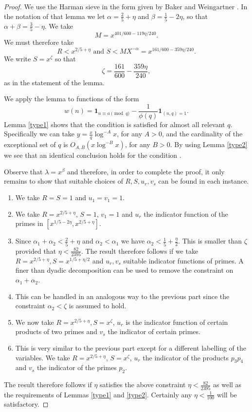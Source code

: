 \documentclass[12pt]{amsart}
\theoremstyle{plain}
\theoremstyle{definition}
\numberwithin{equation}{section}
\def \a{\alpha} \def \b{\beta} \def \d{\delta} \def \e{\varepsilon} \def \g{\gamma} \def \k{\kappa} \def \l{\lambda} \def \s{\sigma} \def \t{\theta} \def \z{\zeta}
\begin{document}
\begin{proof}
We use the Harman sieve in the form given by Baker and Weingartner \cite[Lemma 14]{bakerw}.  In the notation of that lemma we let 
$\a=\frac25+\eta$
and $\b=\frac15-2\eta$, so that $\a+\b=\frac35-\eta$. We take 
$$M=x^{401/600-119\eta/240}.$$ 
We must therefore take 
$$R<x^{2/5+\eta}\text{ and }S<MX^{-\a}=x^{161/600-359\eta/240}.$$
We write $S=x^\zeta$ so that 
$$\zeta=\frac{161}{600}-\frac{359\eta}{240},$$
as in the statement of the lemma.  

We apply the lemma to functions of the form
 $$w(n)=\mathbf{1}_{n\equiv a\pmod q}-\frac{1}{\phi(q)}\mathbf{1}_{(n,q)=1}.$$
Lemma \ref{type1} shows that the condition \cite[(4.1)]{bakerw} is satisfied for almost all relevant $q$.  Specifically we can take $y=\frac{x}{q}\log^{-A}x$, for any $A>0$, and the cardinality of the exceptional set of $q$ is $O_{A,B}(x\log^{-B}x)$, for any $B>0$. By using Lemma \ref{type2} we see that an identical conclusion holds for the condition \cite[(4.2)]{bakerw}.  

Observe that $\l=x^\b$ and therefore, in order to complete the proof, it only remains to show that suitable choices of $R,S,u_r,v_s$ can be found in each instance.

\begin{enumerate}
\item We take $R=S=1$ and $u_1=v_1=1$.

\item We take $R=x^{2/5+\eta}$, $S=1$, $v_1=1$ and $u_r$ the indicator function of the primes in $[x^{1/5-2\eta},x^{2/5+\eta}]$. 

\item Since $\a_1+\a_2<\frac25+\eta$ and $\a_2<\a_1$ we have $\a_2<\frac15+\frac{\eta}{2}$.  This is smaller than $\zeta$ provided that $\eta<\frac{82}{2395}$. The result therefore follows if we take $R=x^{2/5+\eta},S=x^{1/5+\eta/2}$ and $u_r,v_s$ suitable indicator functions of primes.  A finer than dyadic decomposition can be used to remove the constraint on $\a_1+\a_2$.  

\item This can be handled in an analogous way to the previous part since the constraint $\a_2<\zeta$ is assumed to hold.

\item We now take $R=x^{2/5+\eta},S=x^\zeta$, $u_r$ is the indicator function of certain products of two primes and $v_s$ the indicator of certain primes. 

\item This is very similar to the previous part except for a different labelling of the variables.  We take $R=x^{2/5+\eta}$, $S=x^\zeta$, $u_r$ the indicator of the products $p_3p_4$ and $v_s$ the indicator of the primes $p_2$.  
\end{enumerate}

The result therefore follows if $\eta$ satisfies the above constraint $\eta<\frac{82}{2395}$ as well as the requirements of Lemmas \ref{type1} and \ref{type2}.  Certainly any $\eta<\frac{1}{100}$ will be satisfactory.  
\end{proof}  
\end{document}
